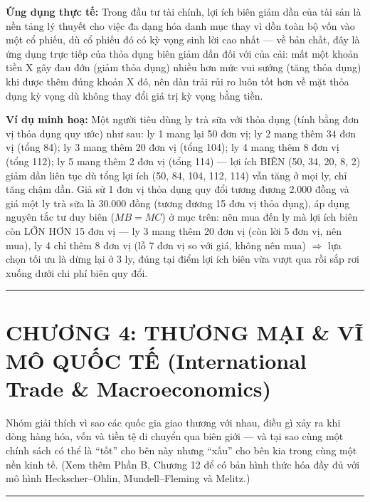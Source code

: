 \documentclass[
]{article}
\begin{document}
\textbf{Ứng dụng thực tế:} Trong đầu tư tài chính, lợi ích biên giảm dần
của tài sản là nền tảng lý thuyết cho việc đa dạng hóa danh mục thay vì
dồn toàn bộ vốn vào một cổ phiếu, dù cổ phiếu đó có kỳ vọng sinh lời cao
nhất --- về bản chất, đây là ứng dụng trực tiếp của thỏa dụng biên giảm
dần đối với của cải: mất một khoản tiền X gây đau đớn (giảm thỏa dụng)
nhiều hơn mức vui sướng (tăng thỏa dụng) khi được thêm đúng khoản X đó,
nên dàn trải rủi ro luôn tốt hơn về mặt thỏa dụng kỳ vọng dù không thay
đổi giá trị kỳ vọng bằng tiền.

\textbf{Ví dụ minh hoạ:} Một người tiêu dùng ly trà sữa với thỏa dụng
(tính bằng đơn vị thỏa dụng quy ước) như sau: ly 1 mang lại 50 đơn vị;
ly 2 mang thêm 34 đơn vị (tổng 84); ly 3 mang thêm 20 đơn vị (tổng 104);
ly 4 mang thêm 8 đơn vị (tổng 112); ly 5 mang thêm 2 đơn vị (tổng 114)
--- lợi ích BIÊN (50, 34, 20, 8, 2) giảm dần liên tục dù tổng lợi ích
(50, 84, 104, 112, 114) vẫn tăng ở mọi ly, chỉ tăng chậm dần. Giả sử 1
đơn vị thỏa dụng quy đổi tương đương 2.000 đồng và giá một ly trà sữa là
30.000 đồng (tương đương 15 đơn vị thỏa dụng), áp dụng nguyên tắc tư duy
biên (\(MB = MC\)) ở mục trên: nên mua đến ly mà lợi ích biên còn LỚN
HƠN 15 đơn vị --- ly 3 mang thêm 20 đơn vị (còn lời 5 đơn vị, nên mua),
ly 4 chỉ thêm 8 đơn vị (lỗ 7 đơn vị so với giá, không nên mua)
\(\Rightarrow\) lựa chọn tối ưu là dừng lại ở 3 ly, đúng tại điểm lợi
ích biên vừa vượt qua rồi sắp rơi xuống dưới chi phí biên quy đổi.

\begin{center}\rule{0.5\linewidth}{0.5pt}\end{center}

\section{CHƯƠNG 4: THƯƠNG MẠI \& VĨ MÔ QUỐC TẾ (International Trade \&
Macroeconomics)}\label{chux1b0ux1a1ng-4-thux1b0ux1a1ng-mux1ea1i-vux129-muxf4-quux1ed1c-tux1ebf-international-trade-macroeconomics}

Nhóm giải thích vì sao các quốc gia giao thương với nhau, điều gì xảy ra
khi dòng hàng hóa, vốn và tiền tệ di chuyển qua biên giới --- và tại sao
cùng một chính sách có thể là ``tốt'' cho bên này nhưng ``xấu'' cho bên
kia trong cùng một nền kinh tế. (Xem thêm Phần B, Chương 12 để có bản
hình thức hóa đầy đủ với mô hình Heckscher--Ohlin, Mundell--Fleming và
Melitz.)

\begin{center}\rule{0.5\linewidth}{0.5pt}\end{center}
\end{document}
